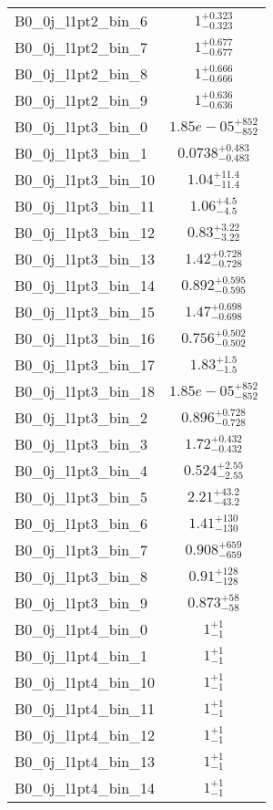 \begin{tabular}{|l|c|}
B0\_0j\_l1pt2\_bin\_6 & $1^{+0.323}_{-0.323}$ \\
B0\_0j\_l1pt2\_bin\_7 & $1^{+0.677}_{-0.677}$ \\
B0\_0j\_l1pt2\_bin\_8 & $1^{+0.666}_{-0.666}$ \\
B0\_0j\_l1pt2\_bin\_9 & $1^{+0.636}_{-0.636}$ \\
B0\_0j\_l1pt3\_bin\_0 & $1.85e-05^{+852}_{-852}$ \\
B0\_0j\_l1pt3\_bin\_1 & $0.0738^{+0.483}_{-0.483}$ \\
B0\_0j\_l1pt3\_bin\_10 & $1.04^{+11.4}_{-11.4}$ \\
B0\_0j\_l1pt3\_bin\_11 & $1.06^{+4.5}_{-4.5}$ \\
B0\_0j\_l1pt3\_bin\_12 & $0.83^{+3.22}_{-3.22}$ \\
B0\_0j\_l1pt3\_bin\_13 & $1.42^{+0.728}_{-0.728}$ \\
B0\_0j\_l1pt3\_bin\_14 & $0.892^{+0.595}_{-0.595}$ \\
B0\_0j\_l1pt3\_bin\_15 & $1.47^{+0.698}_{-0.698}$ \\
B0\_0j\_l1pt3\_bin\_16 & $0.756^{+0.502}_{-0.502}$ \\
B0\_0j\_l1pt3\_bin\_17 & $1.83^{+1.5}_{-1.5}$ \\
B0\_0j\_l1pt3\_bin\_18 & $1.85e-05^{+852}_{-852}$ \\
B0\_0j\_l1pt3\_bin\_2 & $0.896^{+0.728}_{-0.728}$ \\
B0\_0j\_l1pt3\_bin\_3 & $1.72^{+0.432}_{-0.432}$ \\
B0\_0j\_l1pt3\_bin\_4 & $0.524^{+2.55}_{-2.55}$ \\
B0\_0j\_l1pt3\_bin\_5 & $2.21^{+43.2}_{-43.2}$ \\
B0\_0j\_l1pt3\_bin\_6 & $1.41^{+130}_{-130}$ \\
B0\_0j\_l1pt3\_bin\_7 & $0.908^{+659}_{-659}$ \\
B0\_0j\_l1pt3\_bin\_8 & $0.91^{+128}_{-128}$ \\
B0\_0j\_l1pt3\_bin\_9 & $0.873^{+58}_{-58}$ \\
B0\_0j\_l1pt4\_bin\_0 & $1^{+1}_{-1}$ \\
B0\_0j\_l1pt4\_bin\_1 & $1^{+1}_{-1}$ \\
B0\_0j\_l1pt4\_bin\_10 & $1^{+1}_{-1}$ \\
B0\_0j\_l1pt4\_bin\_11 & $1^{+1}_{-1}$ \\
B0\_0j\_l1pt4\_bin\_12 & $1^{+1}_{-1}$ \\
B0\_0j\_l1pt4\_bin\_13 & $1^{+1}_{-1}$ \\
B0\_0j\_l1pt4\_bin\_14 & $1^{+1}_{-1}$ \\

\end{tabular}
